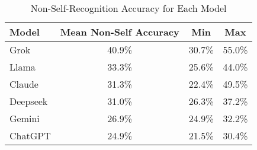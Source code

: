 \begin{table}[ht]
\centering
\renewcommand{\arraystretch}{1.3}
\begin{tabular}{l|c|c|c}
\hline
\textbf{Model} & \textbf{Mean Non-Self Accuracy} & \textbf{Min} & \textbf{Max} \\
\hline
Grok & \cellcolor{blue!15}40.9\% & 30.7\% & 55.0\% \\
Llama & \cellcolor{blue!15}33.3\% & 25.6\% & 44.0\% \\
Claude & \cellcolor{blue!15}31.3\% & 22.4\% & 49.5\% \\
Deepseek & \cellcolor{blue!15}31.0\% & 26.3\% & 37.2\% \\
Gemini & \cellcolor{blue!15}26.9\% & 24.9\% & 32.2\% \\
ChatGPT & \cellcolor{blue!15}24.9\% & 21.5\% & 30.4\% \\
\hline
\end{tabular}
\caption{Non-Self-Recognition Accuracy for Each Model}
\label{tab:non-self-recognition-accuracy}
\end{table}